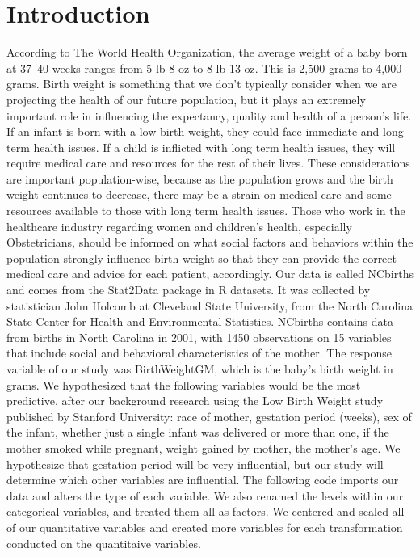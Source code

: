 \documentclass{article}\usepackage[]{graphicx}\usepackage[]{xcolor}
\begin{document}
\section{Introduction}
According to The World Health Organization, the average weight of a baby born at 37–40 weeks ranges from 5 lb 8 oz to 8 lb 13 oz. This is 2,500 grams to 4,000 grams. Birth weight is something that we don't typically consider when we are projecting the health of our future population, but it plays an extremely important role in influencing the expectancy, quality and health of a person's life. If an infant is born with a low birth weight, they could face immediate and long term health issues. If a child is inflicted with long term health issues, they will require medical care and resources for the rest of their lives. These considerations are important population-wise, because as the population grows and the birth weight continues to decrease, there may be a strain on medical care and some resources available to those with long term health issues. Those who work in the healthcare industry regarding women and children's health, especially Obstetricians, should be informed on what social factors and behaviors within the population strongly influence birth weight so that they can provide the correct medical care and advice for each patient, accordingly. Our data is called NCbirths and comes from the Stat2Data package in R datasets. It was collected by statistician John Holcomb at Cleveland State University, from the North Carolina State Center for Health and Environmental Statistics.
NCbirths contains data from births in North Carolina in 2001, with 1450 observations on 15 variables that include social and behavioral characteristics of the mother. The response variable of our study was BirthWeightGM, which is the baby's birth weight in grams. We hypothesized that the following variables would be the most predictive, after our background research using the Low Birth Weight study published by Stanford University: race of mother, gestation period (weeks), sex of the infant, whether just a single infant was delivered or more than one, if the mother smoked while pregnant, weight gained by mother, the mother's age. We hypothesize that gestation period will be very influential, but our study will determine which other variables are influential. The following code imports our data and alters the type of each variable. We also renamed the levels within our categorical variables, and treated them all as factors. We centered and scaled all of our quantitative variables and created more variables for each transformation conducted on the quantitaive variables. 
\end{document}
